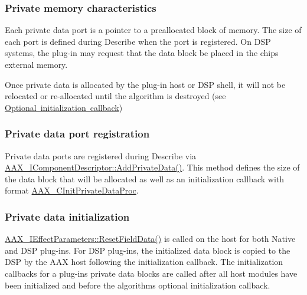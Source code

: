 \hypertarget{a00797_alg_pd_characteristics}{}\subsubsection{Private memory characteristics}\label{a00797_alg_pd_characteristics}
 Each private data port is a pointer to a preallocated block of memory. The size of each port is defined during Describe when the port is registered. On D\+SP systems, the plug-\/in may request that the data block be placed in the chip\textquotesingle{}s external memory.

 Once private data is allocated by the plug-\/in host or D\+SP shell, it will not be relocated or re-\/allocated until the algorithm is destroyed (see \mbox{\hyperlink{a00797_alg_initialization_optional_callback}{Optional initialization callback}})

\hypertarget{a00797_alg_pd_registration}{}\subsubsection{Private data port registration}\label{a00797_alg_pd_registration}
 Private data ports are registered during Describe via \mbox{\hyperlink{a01781_a125949841a13e97ff93fa321f2050433}{A\+A\+X\+\_\+\+I\+Component\+Descriptor\+::\+Add\+Private\+Data()}}. This method defines the size of the data block that will be allocated as well as an initialization callback with format \mbox{\hyperlink{a00401_adfb5d89b9d957c541fc98fe42bc050c4}{A\+A\+X\+\_\+\+C\+Init\+Private\+Data\+Proc}}.

\hypertarget{a00797_alg_pd_init}{}\subsubsection{Private data initialization}\label{a00797_alg_pd_init}
 \mbox{\hyperlink{a01669_a6e87e40d42c7431e52ae5ebd4f631964}{A\+A\+X\+\_\+\+I\+Effect\+Parameters\+::\+Reset\+Field\+Data()}} is called on the host for both Native and D\+SP plug-\/ins. For D\+SP plug-\/ins, the initialized data block is copied to the D\+SP by the A\+AX host following the initialization callback. The initialization callbacks for a plug-\/in\textquotesingle{}s private data blocks are called after all host modules have been initialized and before the algorithm\textquotesingle{}s optional initialization callback.


